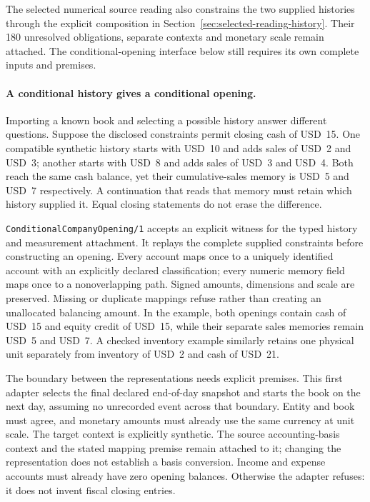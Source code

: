 The selected numerical source reading also constrains the two supplied
histories through the explicit composition in
Section~\ref{sec:selected-reading-history}. Their 180 unresolved obligations,
separate contexts and monetary scale remain attached. The conditional-opening
interface below still requires its own complete inputs and premises.

\paragraph{A conditional history gives a conditional opening.}
Importing a known book and selecting a possible history answer different
questions. Suppose the disclosed constraints permit closing cash of USD~15.
One compatible synthetic history starts with USD~10 and adds sales of USD~2
and USD~3; another starts with USD~8 and adds sales of USD~3 and USD~4.
Both reach the same cash balance, yet their cumulative-sales memory is USD~5
and USD~7 respectively. A continuation that reads that memory must retain
which history supplied it. Equal closing statements do not erase the difference.

\texttt{ConditionalCompanyOpening/1} accepts an explicit witness for the
typed history and measurement attachment. It replays the complete supplied
constraints before constructing an opening. Every account maps once to a
uniquely identified account with an explicitly declared classification; every
numeric memory field maps once to a nonoverlapping path. Signed amounts,
dimensions and scale are preserved. Missing or duplicate mappings refuse
rather than creating an unallocated balancing amount. In the example, both
openings contain cash of USD~15 and equity credit of USD~15, while their
separate sales memories remain USD~5 and USD~7. A checked inventory example
similarly retains one physical unit separately from inventory of USD~2 and
cash of USD~21.

The boundary between the representations needs explicit premises. This first
adapter selects the final declared end-of-day snapshot and starts the book
on the next day, assuming no unrecorded event across that boundary. Entity
and book must agree, and monetary amounts must already use the same currency
at unit scale. The target context is explicitly synthetic. The source
accounting-basis context and the stated mapping premise remain attached to
it; changing the representation does not establish a basis conversion.
Income and expense accounts must already have zero opening balances.
Otherwise the adapter refuses: it does not invent fiscal closing entries.

